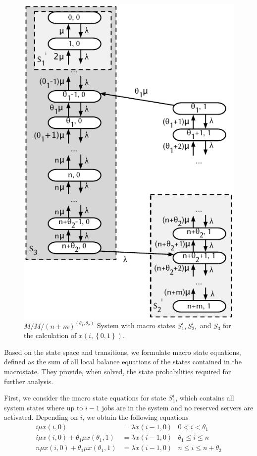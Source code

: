 \begin{figure}
  \centering
  \includegraphics{cloud/data_centers/modeling/figures/state_diagram}
  \caption{\(M/M/(n+m)^{(\theta_1, \theta_2)}\) System with macro states \(S_1^i, S_2^i,\) and \(S_3\) for the calculation of \(x(i, \left\{0, 1\right\})\).}
  \label{fig:cloud:data_centers:modeling:energy_efficient:state_diagram}
\end{figure}

Based on the state space and transitions, we formulate macro state equations, defined as the sum of all local balance equations of the states contained in the macrostate.
They provide, when solved, the state probabilities required for further analysis. 

First,  we consider the macro state equations for state \(S_1^i\), which contains all system states where up to \(i-1\) jobs are in the system and no reserved servers are activated.
Depending on \(i\), we obtain the following equations
\begin{align}
i\mu x(i,0) &= \lambda x(i-1, 0) & 0<i<\theta_1\label{eq:cloud:data_centers:modeling:energy_efficient:S1_1}\\
i\mu x(i,0) + \theta_1 \mu x(\theta_1,1) &= \lambda x(i-1,0) & \theta_1\leq i\leq n\label{eq:cloud:data_centers:modeling:energy_efficient:S1_2}\\
n\mu x(i,0) + \theta_1 \mu x(\theta_1,1) &= \lambda x(i-1,0) & n\leq i\leq n+\theta_2\label{eq:cloud:data_centers:modeling:energy_efficient:S1_3}
\end{align}

